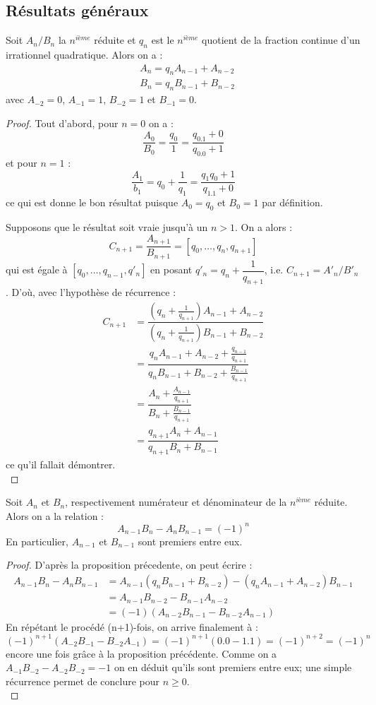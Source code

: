 \documentclass[a4paper]{article} %
\numberwithin{equation}{section}
\begin{document}
\subsection{Résultats généraux}
\begin{prop}
\label{deuxpointscinq}
Soit $A_n/B_n$ la $n^{\textit{ième}}$ réduite et $q_n$ est le $n^{\textit{ième}}$ quotient de la fraction continue d'un irrationnel quadratique. Alors on a :
\begin{align*}
&A_n = q_nA_{n-1} + A_{n-2}\\
&B_n = q_nB_{n-1} + B_{n-2}
\end{align*}
avec $A_{-2} = 0$, $A_{-1} = 1$, $B_{-2} = 1$ et $B_{-1} = 0$.
\end{prop}
\begin{proof}
Tout d'abord, pour $n = 0$ on a :
\[\dfrac{A_0}{B_0}=\dfrac{q_0}{1}=\dfrac{q_0.1+0}{q_0.0+1}\]
et pour $n = 1$ :
\[\dfrac{A_1}{b_1} = q_0 + \dfrac{1}{q_1} = \dfrac{q_1q_0 + 1}{q_1.1 + 0}\]
ce qui est donne le bon résultat puisque $A_0 = q_0$ et $B_0 = 1$ par définition.\par
Supposons que le résultat soit vraie jusqu'à un $n>1$. On a alors :
\[C_{n+1}=\dfrac{A_{n+1}}{B_{n+1}}=[q_0,\dots,q_n,q_{n+1}]\]
qui est égale à $[q_0,\dots,q_{n-1}, q'_n]$ en posant $q'_n=q_n + \dfrac{1}{q_{n+1}}$, i.e. $C_{n+1}=A'_n/B'_n$. D'où, avec l'hypothèse de récurrence :
\begin{align*}
C_{n+1}&=\dfrac{(q_n+\frac{1}{q_{n+1}})A_{n-1}+A_{n-2}}{(q_n+\frac{1}{q_{n+1}})B_{n-1}+B_{n-2}}\\
&=\dfrac{q_nA_{n-1}+A_{n-2}+\frac{q_{n-1}}{q_{n+1}}}{q_nB_{n-1}+B_{n-2}+\frac{B_{n-1}}{q_{n+1}}}\\
&=\dfrac{A_n + \frac{A_{n-1}}{q_{n+1}}}{B_n + \frac{B_{n-1}}{q_{n+1}}}\\
&=\dfrac{q_{n+1}A_n + A_{n-1}}{q_{n+1}B_n + B_{n-1}}
\end{align*}
ce qu'il fallait démontrer.\\
\end{proof}
\begin{prop}
\label{moinsunn}
Soit $A_n$ et $B_n$, respectivement numérateur et dénominateur de la $n^{\textit{ième}}$ réduite. Alors on a la relation :
\[A_{n-1}B_n - A_nB_{n-1} = (-1)^n\]
En particulier, $A_{n-1}$ et $B_{n-1}$ sont premiers entre eux.
\end{prop}
\begin{proof}
D'après la proposition précedente, on peut écrire : 
\begin{align*}
A_{n-1}B_n-A_nB_{n-1}&=A_{n-1}(q_nB_{n-1} + B_{n-2}) - (q_nA_{n-1} + A_{n-2})B_{n-1}\\
&=A_{n-1}B_{n-2} - B_{n-1}A_{n-2}\\
&=(-1)(A_{n-2}B_{n-1} - B_{n-2}A_{n-1})
\end{align*}
En répétant le procédé (n+1)-fois, on arrive finalement à :
\[(-1)^{n+1}(A_{-2}B_{-1} - B_{-2}A_{-1}) = (-1)^{n+1}(0.0 - 1.1) = (-1)^{n+2} = (-1)^n\]
encore une fois grâce à la proposition précédente.	Comme on a $A_{-1}B_{-2} - A_{-2}B_{-2} = -1$ on en déduit qu'ils sont premiers entre eux; une simple récurrence permet de conclure pour $n\geq0$.\\
\end{proof}
\end{document}
